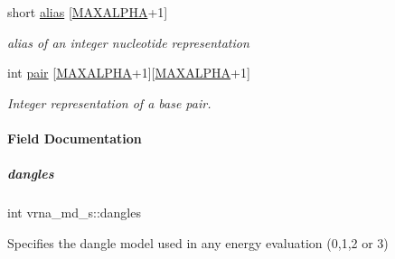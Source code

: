 \begin{DoxyCompactItemize}
short \mbox{\hyperlink{group__model__details_a66136cf9abc8ff790ec0d33245d68fd5}{alias}} \mbox{[}\mbox{\hyperlink{group__model__details_ga05a5ffe718aa431d97419a12fb082379}{M\+A\+X\+A\+L\+P\+HA}}+1\mbox{]}
\begin{DoxyCompactList}\small\item\em alias of an integer nucleotide representation \end{DoxyCompactList}\item 
\mbox{\label{group__model__details_ab4da594c638707e212f64aadb54a7454}} 
int \mbox{\hyperlink{group__model__details_ab4da594c638707e212f64aadb54a7454}{pair}} \mbox{[}\mbox{\hyperlink{group__model__details_ga05a5ffe718aa431d97419a12fb082379}{M\+A\+X\+A\+L\+P\+HA}}+1\mbox{]}\mbox{[}\mbox{\hyperlink{group__model__details_ga05a5ffe718aa431d97419a12fb082379}{M\+A\+X\+A\+L\+P\+HA}}+1\mbox{]}
\begin{DoxyCompactList}\small\item\em Integer representation of a base pair. \end{DoxyCompactList}\end{DoxyCompactItemize}


\paragraph{Field Documentation}
\mbox{\label{group__model__details_adcda4ff2ea77748ae0e8700288282efc}} 
\subparagraph{\texorpdfstring{dangles}{dangles}}
{\footnotesize\ttfamily int vrna\+\_\+md\+\_\+s\+::dangles}



Specifies the dangle model used in any energy evaluation (0,1,2 or 3) 

